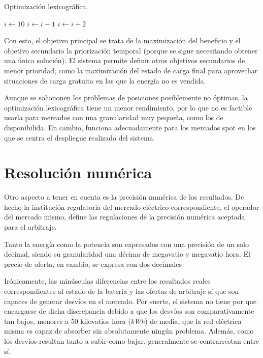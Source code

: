 \begin{algorithm}
  \caption{Optimización lexicográfica.}
  \label{alg:optimización-lexicográfica}
  \begin{algorithmic}
    \State $i \gets 10$
    \State $i \gets i-1$
    \Else
    \State $i \gets i+2$
    \EndIf
    \EndIf
  \end{algorithmic}
\end{algorithm}

Con esto, el objetivo principal se trata de la maximización del beneficio y el objetivo secundario la priorización temporal (porque se sigue necesitando obtener una única solución). El sistema permite definir otros objetivos secundarios de menor prioridad, como la maximización del estado de carga final para aprovechar situaciones de carga gratuita en las que la energía no es vendida.

Aunque se solucionen los problemas de posiciones posiblemente no óptimas, la optimización lexicográfica tiene un menor rendimiento, por lo que no es factible usarla para mercados con una granularidad muy pequeña, como los de disponibilida. En cambio, funciona adecuadamente para los mercados spot en los que se centra el despliegue realizado del sistema.

\section{Resolución numérica}
\label{makereference5.5}

Otro aspecto a tener en cuenta es la precisión numérica de los resultados. De hecho la institución regulatoria del mercado eléctrico correspondiente, el operador del mercado mismo, define las regulaciones de la precisión numérica aceptada para el arbitraje.

Tanto la energía como la potencia son expresados con una precisión de un solo decimal, siendo su granularidad una décima de megavatio y megavatio hora. El precio de oferta, en cambio, se expresa con dos decimales

Irónicamente, las minúsculas diferencias entre los resultados reales correspondientes al estado de la batería y las ofertas de arbitraje sí que son capaces de generar desvíos en el mercado. Por suerte, el sistema no tiene por que encargarse de dicha discrepancia debido a que los desvíos son comparativamente tan bajos, menores a 50 kilovatios hora (\textit{kWh}) de media, que la red eléctrica misma es capaz de absorber sin absolutamente ningún problema. Además, como los desvíos resultan tanto a subir como bajar, generalmente se contrarrestan entre sí.
